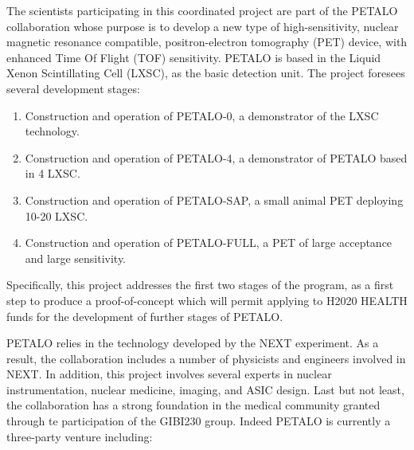 The scientists participating in this coordinated project are part of the PETALO collaboration
whose purpose is to develop a new type of  high-sensitivity, nuclear magnetic resonance compatible, positron-electron tomography (PET) device, with enhanced Time Of Flight (TOF) sensitivity. PETALO is based in the Liquid Xenon Scintillating Cell (LXSC), as the basic detection unit. The project foresees several development stages:
\begin{enumerate}
\item Construction and operation of PETALO-0, a demonstrator of the LXSC technology. 
\item Construction and operation of PETALO-4, a demonstrator of PETALO based in 4 LXSC.
\item Construction and operation of PETALO-SAP, a small animal PET deploying 10-20 LXSC.
\item Construction and operation of PETALO-FULL, a PET of large acceptance and large sensitivity.
\end{enumerate}

Specifically, this project addresses the first two stages of the program, as a first step to produce a proof-of-concept which will permit applying to H2020 HEALTH funds for the development of further stages of PETALO.

PETALO relies in the technology developed by the NEXT experiment. As a result, the  collaboration includes a number of physicists and engineers involved in NEXT. In addition, this project involves several experts in nuclear instrumentation, nuclear medicine, imaging, and ASIC design. Last but not least, the collaboration has a strong foundation in the medical community granted through te participation of the GIBI230 group. Indeed PETALO is currently a three-party venture including:

